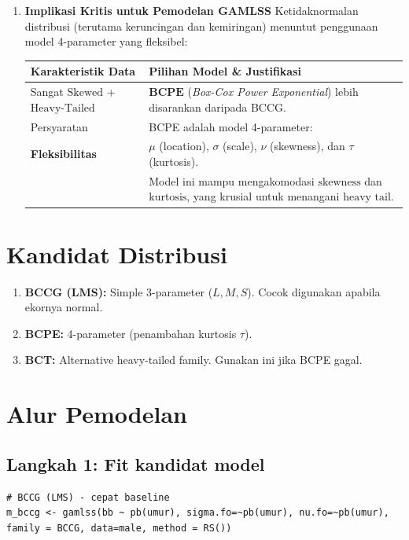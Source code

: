 \documentclass[11pt, a4paper]{article}
\begin{document}
\begin{enumerate}
\begin{enumerate}
    \item \textbf{Implikasi Kritis untuk Pemodelan GAMLSS}
    Ketidaknormalan distribusi (terutama keruncingan dan kemiringan) menuntut penggunaan model 4-parameter yang fleksibel:
    \centering
    \small
    \begin{tabular}{|l|p{8cm}|}
    \hline
    \textbf{Karakteristik Data} & \textbf{Pilihan Model \& Justifikasi} \\
    \hline
    Sangat $\text{Skewed}$ + $\text{Heavy-Tailed}$ & $\mathbf{BCPE}$ (\textit{Box-Cox Power Exponential}) lebih disarankan daripada BCCG. \\
    \hline
    Persyaratan & BCPE adalah model 4-parameter: \\
    \textbf{Fleksibilitas} & $\mu$ (location), $\sigma$ (scale), $\nu$ (skewness), dan $\tau$ (kurtosis). \\
    & Model ini mampu mengakomodasi $\text{skewness}$ dan $\text{kurtosis}$, yang krusial untuk menangani $\text{heavy tail}$. \\
    \hline
    \end{tabular}
\end{enumerate}

\section{Kandidat Distribusi}
\begin{enumerate}
    \item \textbf{BCCG (LMS):} Simple 3-parameter ($L, M, S$). Cocok digunakan apabila ekornya normal.
    \item \textbf{BCPE:} 4-parameter (penambahan kurtosis $\tau$).
    \item \textbf{BCT:} Alternative heavy-tailed family. Gunakan ini jika BCPE gagal.
\end{enumerate}

\section{Alur Pemodelan}

\subsection{Langkah 1: Fit kandidat model}
\begin{lstlisting}
# BCCG (LMS) - cepat baseline
m_bccg <- gamlss(bb ~ pb(umur), sigma.fo=~pb(umur), nu.fo=~pb(umur), family = BCCG, data=male, method = RS())


\end{lstlisting}
\end{enumerate}
\end{document}
